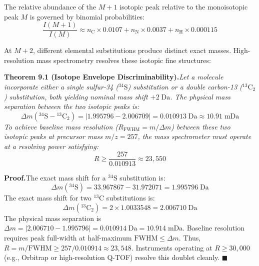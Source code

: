 \documentclass[11pt,twoside,openright]{book}
\begin{document}
The relative abundance of the $M+1$ isotopic peak relative to the monoisotopic peak $M$ is governed by binomial probabilities:
\begin{equation}
\frac{I(M+1)}{I(M)} \approx n_{\text{C}} \times 0.0107 + n_{\text{N}} \times 0.0037 + n_{\text{H}} \times 0.000115
\label{eq:m1_ratio}
\end{equation}

At $M+2$, different elemental substitutions produce distinct exact masses. High-resolution mass spectrometry resolves these isotopic fine structures:

\vspace{0.6em}
\noindent\textbf{Theorem 9.1 (Isotope Envelope Discriminability).}\enspace\textit{Let a molecule incorporate either a single sulfur-34 ($^{34}\text{S}$) substitution or a double carbon-13 ($^{13}\text{C}_2$) substitution, both yielding nominal mass shift $+2\;\text{Da}$. The physical mass separation between the two isotopic peaks is:
\begin{equation}
\Delta m(^{34}\text{S} - {}^{13}\text{C}_2) = |1.995796 - 2.006709| = 0.010913\;\text{Da} \approx 10.91\;\text{mDa}
\end{equation}
To achieve baseline mass resolution ($R_{\text{FWHM}} = m / \Delta m$) between these two isotopic peaks at precursor mass $m/z = 257$, the mass spectrometer must operate at a resolving power satisfying:
\begin{equation}
R \ge \frac{257}{0.010913} \approx 23,550
\end{equation}}

\vspace{0.4em}
\noindent\textbf{Proof.}\enspace The exact mass shift for a $^{34}\text{S}$ substitution is:
\begin{equation*}
\Delta m(^{34}\text{S}) = 33.967867 - 31.972071 = 1.995796\;\text{Da}
\end{equation*}
The exact mass shift for two $^{13}\text{C}$ substitutions is:
\begin{equation*}
\Delta m(^{13}\text{C}_2) = 2 \times 1.0033548 = 2.006710\;\text{Da}
\end{equation*}
The physical mass separation is $\Delta m = |2.006710 - 1.995796| = 0.010914\;\text{Da} = 10.914\;\text{mDa}$. Baseline resolution requires peak full-width at half-maximum $\text{FWHM} \le \Delta m$. Thus, $R = m / \text{FWHM} \ge 257 / 0.010914 \approx 23,548$. Instruments operating at $R \ge 30,000$ (e.g., Orbitrap or high-resolution Q-TOF) resolve this doublet cleanly. \hfill $\blacksquare$
\end{document}
